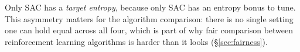 \begin{why}
Only SAC has a \emph{target entropy}, because only SAC has an entropy bonus to
tune. This asymmetry matters for the algorithm comparison: there is no single
setting one can hold equal across all four, which is part of why fair comparison
between reinforcement learning algorithms is harder than it looks
(\S\ref{sec:fairness}).
\end{why}
